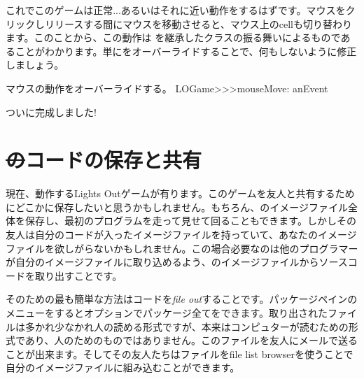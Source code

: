 \documentclass[a4paper,10pt,twoside]{book}
\begin{document}


これでこのゲームは正常...あるいはそれに近い動作をするはずです。マウスをクリックしリリースする間にマウスを移動させると、マウス上のcellも切り替わります。このことから、この動作は  を継承したクラスの振る舞いによるものであることがわかります。単にをオーバーライドすることで、何もしないように修正しましょう。

\begin{method}[mouseMove:]{マウスの動作をオーバーライドする。}
LOGame>>>mouseMove: anEvent
\end{method}

ついに完成しました!


\section{\st のコードの保存と共有}

現在、動作するLights Outゲームが有ります。このゲームを友人と共有するためにどこかに保存したいと思うかもしれません。もちろん、\pharo のイメージファイル全体を保存し、最初のプログラムを走って見せて回ることもできます。しかしその友人は自分のコードが入ったイメージファイルを持っていて、あなたのイメージファイルを欲しがらないかもしれません。この場合必要なのは他のプログラマーが自分のイメージファイルに取り込めるよう、\pharo のイメージファイルからソースコードを取り出すことです。

そのための最も簡単な方法はコードを\emph{file out}することです。パッケージペインのメニューを\actclick するとオプションでパッケージ全てをできます。取り出されたファイルは多かれ少なかれ人の読める形式ですが、本来はコンピュターが読むための形式であり、人のためのものではありません。このファイルを友人にメールで送ることが出来ます。そしてその友人たちはファイルをfile list browserを使うことで自分の\pharo イメージファイルに組み込むことができます。
\end{document}
